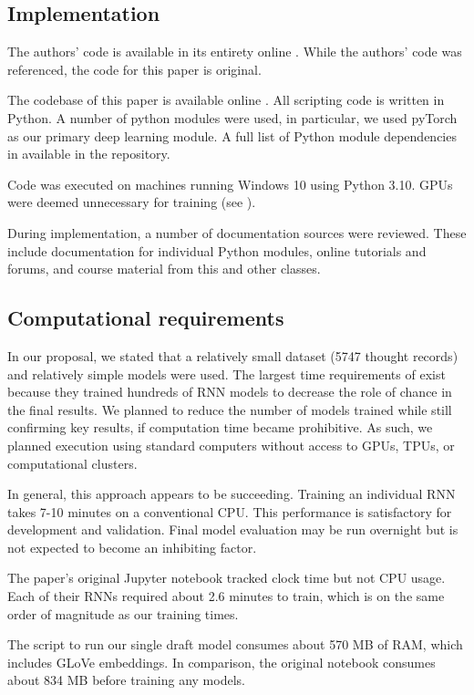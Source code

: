 \documentclass[11pt,a4paper]{article}
\begin{document}
\subsection{Implementation}
The authors' code is available in its entirety online \citep{burger_2021_data}. While the authors' code was referenced, the code for this paper is original. 

The codebase of this paper is available online \citep{cs598_repo}. All scripting code is written in Python. A number of python modules were used, in particular, we used pyTorch as our primary deep learning module. A full list of Python module dependencies in available in the repository. 

Code was executed on machines running Windows 10 using Python 3.10. GPUs were deemed unnecessary for training (see ). 

During implementation, a number of documentation sources were reviewed. These include documentation for individual Python modules, online tutorials and forums, and course material from this and other classes.  

\subsection{Computational requirements}
\label{comp_reqs}

In our proposal, we stated that a relatively small dataset (5747 thought records) and relatively simple models were used. 
The largest time requirements of \citet{burger_2021} exist because they trained hundreds of RNN models to decrease the role of chance in the final results. We planned to reduce the number of models trained while still confirming key results, if computation time became prohibitive. As such, we planned execution using standard computers without access to GPUs, TPUs, or computational clusters. 

In general, this approach appears to be succeeding. Training an individual RNN takes 7-10 minutes on a conventional CPU. This performance is satisfactory for development and validation. Final model evaluation may be run overnight but is not expected to become an inhibiting factor. 

The paper's original Jupyter notebook tracked clock time but not CPU usage. Each of their RNNs required about 2.6 minutes to train, which is on the same order of magnitude as our training times.

The script to run our single draft model consumes about 570 MB of RAM, which includes GLoVe embeddings. In comparison, the original notebook consumes about 834 MB before training any models.
\end{document}
